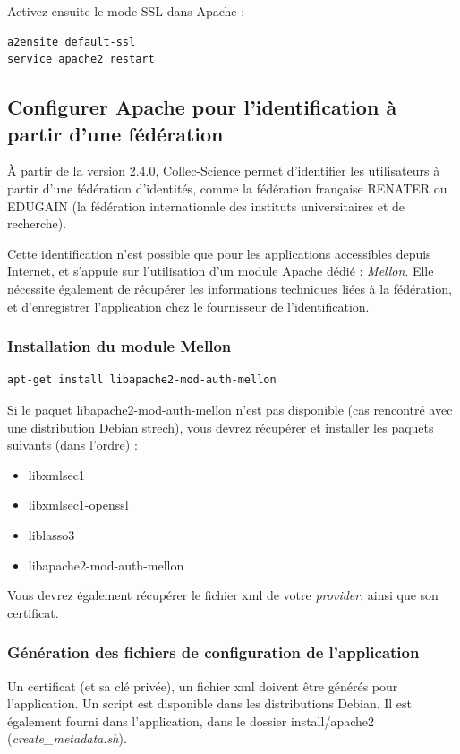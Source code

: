 Activez ensuite le mode SSL dans Apache :
\begin{lstlisting}
a2ensite default-ssl
service apache2 restart
\end{lstlisting}

\subsection{Configurer Apache pour l'identification à partir d'une fédération}
\label{mellon}
À partir de la version 2.4.0, Collec-Science permet d'identifier les utilisateurs à partir d'une fédération d'identités, comme la fédération française RENATER ou EDUGAIN (la fédération internationale des instituts universitaires et de recherche).

Cette identification n'est possible que pour les applications accessibles depuis Internet, et s'appuie sur l'utilisation d'un module Apache dédié : \textit{Mellon}. Elle nécessite également de récupérer les informations techniques liées à la fédération, et d'enregistrer l'application chez le fournisseur de l'identification.

\subsubsection{Installation du module Mellon}
\begin{lstlisting}
apt-get install libapache2-mod-auth-mellon
\end{lstlisting}

Si le paquet libapache2-mod-auth-mellon n'est pas disponible (cas rencontré avec une distribution Debian strech), vous devrez récupérer et installer les paquets suivants (dans l'ordre) :
\begin{itemize}
	\item libxmlsec1
	\item libxmlsec1-openssl
	\item liblasso3
	\item libapache2-mod-auth-mellon
\end{itemize}

Vous devrez également récupérer le fichier xml de votre \textit{provider}, ainsi que son certificat.

\subsubsection{Génération des fichiers de configuration de l'application}
Un certificat (et sa clé privée), un fichier xml doivent être générés pour l'application. Un script est disponible dans les distributions Debian. Il est également fourni dans l'application, dans le dossier install/apache2 (\textit{create\_metadata.sh}).

